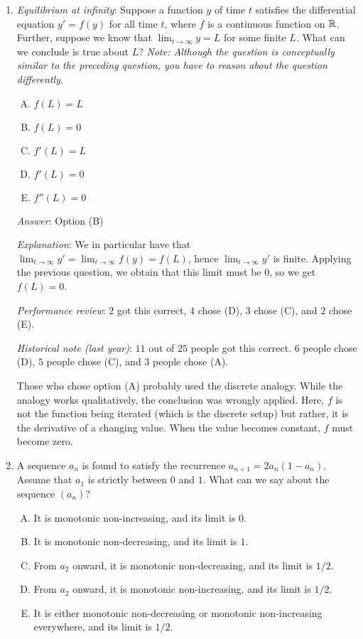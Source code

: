 \documentclass[10pt]{amsart}
\begin{document}
\begin{enumerate}
  {\em Answer}: Option (A)

  {\em Explanation}: This was one of your homework problems (Advanced
  3 on HW 7).

  {\em Performance review}: $6$ out of $11$ people got this
  correct. $4$ chose (D), $1$ chose (C).

\item {\em Equilibrium at infinity}: Suppose a function $y$ of time
  $t$ satisfies the differential equation $y' = f(y)$ for all time
  $t$, where $f$ is a continuous function on $\mathbb{R}$. Further, suppose we
  know that $\lim_{t \to \infty} y = L$ for some finite $L$. What can
  we conclude is true about $L$?  {\em Note: Although the question is
  conceptually similar to the preceding question, you have to reason
  about the question differently.}
  \begin{enumerate}[(A)]
  \item $f(L) = L$
  \item $f(L) = 0$
  \item $f'(L) = L$
  \item $f'(L) = 0$
  \item $f''(L) = 0$
  \end{enumerate}

  {\em Answer}: Option (B)

  {\em Explanation}: We in particular have that $\lim_{t \to \infty}
  y' = \lim_{t \to \infty} f(y) = f(L)$, hence $\lim_{t \to \infty}
  y'$ is finite. Applying the previous question, we obtain that this
  limit must be $0$, so we get $f(L) = 0$.

  {\em Performance review}: $2$ got this correct, $4$ chose (D), $3$
  chose (C), and $2$ chose (E).

  {\em Historical note (last year)}: $11$ out of $25$ people got this
  correct. $6$ people chose (D), $5$ people chose (C), and $3$ people
  chose (A).

  Those who chose option (A) probably used the discrete analogy. While
  the analogy works qualitatively, the conclusion was wrongly
  applied. Here, $f$ is not the function being iterated (which is the
  discrete setup) but rather, it is the derivative of a changing
  value. When the value becomes constant, $f$ must become zero.

\item A sequence $a_n$ is found to satisfy the recurrence $a_{n+1} =
  2a_n(1 - a_n)$. Assume that $a_1$ is strictly between $0$ and
  $1$. What can we say about the sequence $(a_n)$?
  \begin{enumerate}[(A)]
  \item It is monotonic non-increasing, and its limit is $0$.
  \item It is monotonic non-decreasing, and its limit is $1$.
  \item From $a_2$ onward, it is monotonic non-decreasing, and its
    limit is $1/2$.
  \item From $a_2$ onward, it is monotonic non-increasing, and its
    limit is $1/2$.
  \item It is either monotonic non-decreasing or monotonic
    non-increasing everywhere, and its limit is $1/2$.
  \end{enumerate}


\end{enumerate}
\end{document}

